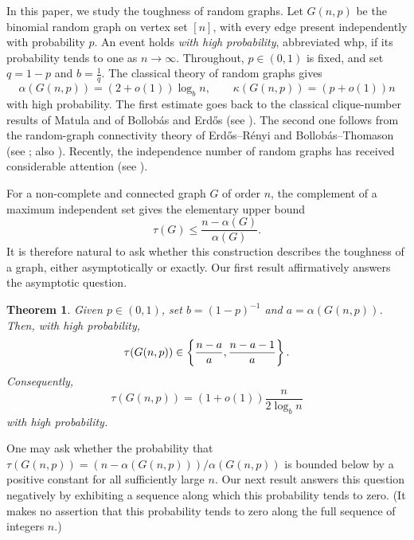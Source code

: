 \documentclass[11pt,reqno]{amsart}
\newtheorem{theorem}{Theorem}[section]
\theoremstyle{definition}
\theoremstyle{remark}
\begin{document}
In this paper, we study  the toughness of random graphs.  Let $G(n,p)$ be the binomial random graph on vertex set $[n]$, with every edge present independently with probability $p$.  An event holds \emph{with high probability}, abbreviated whp, if its probability tends to one as $n\to\infty$. Throughout, $p\in(0,1)$ is fixed, and set $q=1-p$ and
$b=\frac1q.$
The classical theory of random graphs gives
\begin{equation}\label{eq:standard-random-parameters}
 \alpha(G(n,p))=(2+o(1))\log_b n,
 \qquad
 \kappa(G(n,p))=(p+o(1))n
\end{equation}
with high probability.  The first estimate goes back to the classical clique-number results of Matula and of Bollob\'as and Erd\H{o}s (see \cite{Matula1970,BollobasErdos1976}).  The second one follows from the random-graph connectivity theory of Erd\H{o}s--R\'enyi and Bollob\'as--Thomason (see \cite{ErdosRenyi1961,BollobasThomason1985};  also \cite[Chapters 7 and 11]{Bollobas2001}).  Recently, the independence number of random graphs has received considerable attention (see \cite{BohmanHofstad2024}).

For a non-complete and connected graph $G$ of order $n$, the complement of a maximum independent set gives the elementary upper bound
\begin{equation}\label{eq:independence-upper-intro}
 \tau(G)\le \frac{n-\alpha(G)}{\alpha(G)}.
\end{equation}
It is therefore natural to ask whether this construction describes the toughness of a graph, either asymptotically or exactly.  Our first result  affirmatively answers the asymptotic question.

\begin{theorem}\label{thm:main-asymptotic}
Given $p\in(0,1)$, set $b=(1-p)^{-1}$ and $a=\alpha(G(n,p))$.  Then, with high probability,
\begin{equation}\label{eq:quantitative-envelope}
\tau(G(n,p))\in\left\{\frac{n-a}{a},\frac{n-a-1}{a}\right\}.
\notag
\end{equation}
Consequently,
\[
 \tau(G(n,p))
 =(1+o(1))\frac{n}{2\log_b n}
\] with high probability.
\end{theorem}

One may ask whether the probability that
$\tau(G(n,p))=(n-\alpha(G(n,p)))/\alpha(G(n,p))$ is bounded below by a
positive constant for all sufficiently large $n$. Our next result answers
this question negatively by exhibiting a sequence along which this
probability tends to zero. (It makes no assertion that this probability
tends to zero along the full sequence of integers $n$.)
\end{document}
